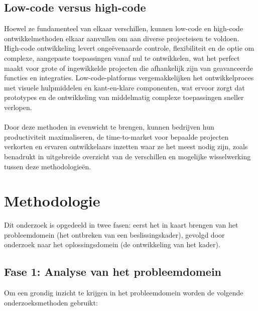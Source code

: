 \subsection{Low-code versus high-code}
Hoewel ze fundamenteel van elkaar verschillen, kunnen low-code en high-code ontwikkelmethoden elkaar aanvullen om aan diverse projecteisen te voldoen. High-code ontwikkeling levert ongeëvenaarde controle, flexibiliteit en de optie om complexe, aangepaste toepassingen vanaf nul te ontwikkelen, wat het perfect maakt voor grote of ingewikkelde projecten die afhankelijk zijn van geavanceerde functies en integraties. Low-code-platforms vergemakkelijken het ontwikkelproces met visuele hulpmiddelen en kant-en-klare componenten, wat ervoor zorgt dat prototypes en de ontwikkeling van middelmatig complexe toepassingen sneller verlopen.
\\
\\
Door deze methoden in evenwicht te brengen, kunnen bedrijven hun productiviteit maximaliseren, de time-to-market voor bepaalde projecten verkorten en ervaren ontwikkelaars inzetten waar ze het meest nodig zijn, zoals \textcite{Ballejos2024} benadrukt in uitgebreide overzicht van de verschillen en mogelijke wisselwerking tussen deze methodologieën.




\section{Methodologie}%
\label{sec:methodologie}
Dit onderzoek is opgedeeld in twee fasen: eerst het in kaart brengen van het probleemdomein (het ontbreken van een beslissingskader), gevolgd door onderzoek naar het oplossingsdomein (de ontwikkeling van het kader).
\subsection{Fase 1: Analyse van het probleemdomein}
Om een grondig inzicht te krijgen in het probleemdomein worden de volgende onderzoeksmethoden gebruikt:
